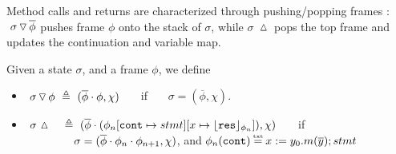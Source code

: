 


 
Method calls and returns %
are characterized through pushing/popping   frames :
$  \ {\sigma} \, {\triangledown}\, \overline{\phi} $ pushes 
frame $\phi$ onto the stack of $\sigma$, while
$\sigma$ $\, {\vartriangle}\,$   pops the top frame %
and updates the continuation and variable map.

 
 
 
 
\begin{definition}
\label{def:push:frame}
Given a state $\sigma$, and a frame $\phi$,  we define
\begin{itemize}
\item
 $  \ {\sigma} \, {\triangledown}\, {\phi}  \ \triangleq \ ({\overline{\phi}\cdot\phi}, \chi)$ \ \ \  if \ \ \  $\sigma=(\overline{\phi}, \chi)$.
\item
$ \ \sigma\, \popSymbol \ \ \  \triangleq\   { (\overline{\phi}\cdot (\phi_n[\prg{cont}\mapsto stmt][x \mapsto \interpret {\phi_n}{\prg{res}}]), \chi)}$ \ \ \  if \\
 $\strut \hspace{1.5cm} \sigma=(\overline{\phi}\cdot\phi_n\cdot\phi_{n+1}, \chi)$, and $\phi_n(\prg{cont})\txteq x:= y_0.m(\overline y); stmt $
\end{itemize}
 \end{definition}

